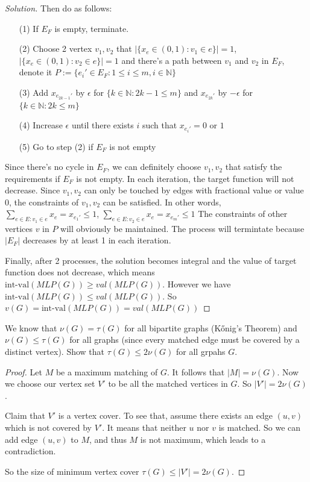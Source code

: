 \begin{proof}[Solution]
        Then do as follows:
        \begin{itemize}
            \item[(1)] If $E_F$ is empty, terminate.
            \item[(2)] Choose 2 vertex $v_1,v_2$ that $|\{x_e\in(0,1):v_1\in e\}|=1$, $|\{x_e\in(0,1):v_2\in e\}|=1$ and there's a path between $v_1$ and $v_2$ in $E_F$, denote it $P:=\{e_{i}'\in E_F:1\le i \le m,i\in\mathbb{N}\}$
            \item[(3)] Add $x_{e_{2k-1}'}$ by $\epsilon$ for $\{k\in\mathbb{N}:2k-1\le m\}$ and $x_{e_{2k}'}$ by $-\epsilon$ for $\{k\in\mathbb{N}:2k\le m\}$
            \item[(4)] Increase $\epsilon$ until there exists $i$ such that $x_{e_{i}'}=0 \text{ or } 1$
            \item[(5)] Go to step (2) if $E_F$ is not empty
        \end{itemize}
        Since there's no cycle in $E_F$, we can definitely choose $v_1,v_2$ that satisfy the requirements if $E_F$ is not empty.
        In each iteration, the target function will not decrease.
        Since $v_1,v_2$ can only be touched by edges with fractional value or value 0, the constraints of $v_1,v_2$ can be satisfied.
        In other words, $\sum_{e\in E:v_1\in e}x_e =x_{e_{1}'} \le 1$, $\sum_{e\in E:v_2\in e}x_e =x_{e_{m}'} \le 1$
        The constraints of other vertices $v$ in $P$ will obviously be maintained.
        The process will termintate because $|E_F|$ decreases by at least 1 in each iteration.

        Finally, after 2 processes, the solution becomes integral and the value of target function does not decrease, which means $\text{int-val}(MLP(G))\ge val(MLP(G))$.
        However we have  $\text{int-val}(MLP(G))\le val(MLP(G))$.
        So $v(G)=\text{int-val}(MLP(G))= val(MLP(G))$
    \end{proof}


    \begin{thm}{}{}
        We know that $\nu(G) = \tau(G)$ for all bipartite graphs (K\H{o}nig's Theorem) and $\nu(G) \leq \tau(G)$ for all graphs (since every matched edge must be covered by a distinct vertex). Show that $\tau(G) \leq 2\nu(G)$ for all grpahs $G$.
    \end{thm}

    \begin{proof}
        Let $M$ be a maximum matching of $G$. It follows that $|M| = \nu(G)$. Now we choose our vertex set $V'$ to be all the matched vertices in $G$. So $|V'| = 2\nu(G)$. 
        
        Claim that $V'$ is a vertex cover. To see that, assume there exists an edge $(u, v)$ which is not covered by $V'$. It means that neither $u$ nor $v$ is matched. So we can add edge $(u, v)$ to $M$, and thus $M$ is not maximum, which leads to a contradiction.
        
        So the size of minimum vertex cover $\tau(G) \leq |V'| = 2\nu(G)$.
    \end{proof}

